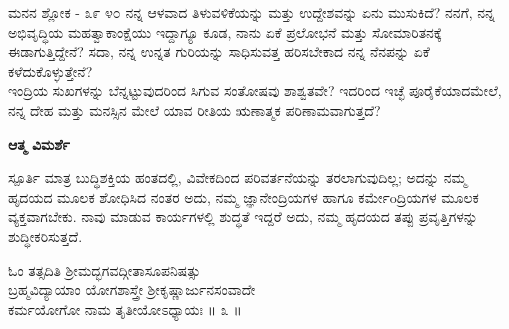 \begin{mananam}{\mananamfont ಮನನ ಶ್ಲೋಕ - ೩೯ ೪೦}
\mananamtext ನನ್ನ ಆಳವಾದ ತಿಳುವಳಿಕೆಯನ್ನು ಮತ್ತು ಉದ್ದೇಶವನ್ನು ಏನು ಮುಸುಕಿದೆ? ನನಗೆ, ನನ್ನ ಅಭಿವೃದ್ಧಿಯ ಮಹತ್ವಾಕಾಂಕ್ಷೆಯು ಇದ್ದಾಗ್ಯೂ ಕೂಡ, ನಾನು ಏಕೆ ಪ್ರಲೋಭನೆ ಮತ್ತು ಸೋಮಾರಿತನಕ್ಕೆ ಈಡಾಗುತ್ತಿದ್ದೇನೆ? ಸದಾ, ನನ್ನ ಉನ್ನತ ಗುರಿಯನ್ನು ಸಾಧಿಸುವತ್ತ ಹರಿಸಬೇಕಾದ ನನ್ನ ನೆನಪನ್ನು ಏಕೆ ಕಳೆದುಕೊಳ್ಳುತ್ತೇನೆ?\\
ಇಂದ್ರಿಯ ಸುಖಗಳನ್ನು ಬೆನ್ನಟ್ಟುವುದರಿಂದ ಸಿಗುವ ಸಂತೋಷವು ಶಾಶ್ವತವೇ? ಇದರಿಂದ ಇಚ್ಛೆ ಪೂರೈಕೆಯಾದಮೇಲೆ, ನನ್ನ ದೇಹ ಮತ್ತು ಮನಸ್ಸಿನ ಮೇಲೆ ಯಾವ ರೀತಿಯ ಋಣಾತ್ಮಕ ಪರಿಣಾಮವಾಗುತ್ತದೆ? 
\end{mananam}
\WritingHand\enspace\textbf{ಆತ್ಮ ವಿಮರ್ಶೆ}\\
\begin{inspiration}{\mananamfont ಸ್ಪೂರ್ತಿ}
\mananamtext ಮಾತ್ರ ಬುದ್ಧಿಶಕ್ತಿಯ ಹಂತದಲ್ಲಿ, ವಿವೇಕದಿಂದ ಪರಿವರ್ತನೆಯನ್ನು ತರಲಾಗುವುದಿಲ್ಲ; ಅದನ್ನು ನಮ್ಮ ಹೃದಯದ ಮೂಲಕ ಶೋಧಿಸಿದ ನಂತರ ಅದು, ನಮ್ಮ ಜ್ಞಾನೇಂದ್ರಿಯಗಳ ಹಾಗೂ ಕರ್ಮೇoದ್ರಿಯಗಳ ಮೂಲಕ  ವ್ಯಕ್ತವಾಗಬೇಕು. ನಾವು ಮಾಡುವ ಕಾರ್ಯಗಳಲ್ಲಿ ಶುದ್ಧತೆ ಇದ್ದರೆ ಅದು, ನಮ್ಮ ಹೃದಯದ ತಪ್ಪು ಪ್ರವೃತ್ತಿಗಳನ್ನು ಶುದ್ಧೀಕರಿಸುತ್ತದೆ.
\end{inspiration}
\newpage

\begin{center}
ಓಂ ತತ್ಸದಿತಿ ಶ್ರೀಮದ್ಭಗವದ್ಗೀತಾಸೂಪನಿಷತ್ಸು \\ಬ್ರಹ್ಮವಿದ್ಯಾಯಾಂ ಯೋಗಶಾಸ್ತ್ರೇ ಶ್ರೀಕೃಷ್ಣಾರ್ಜುನಸಂವಾದೇ\\
ಕರ್ಮಯೋಗೋ ನಾಮ ತೃತೀಯೋಽಧ್ಯಾಯಃ ॥ ೩ ॥
\end{center}

